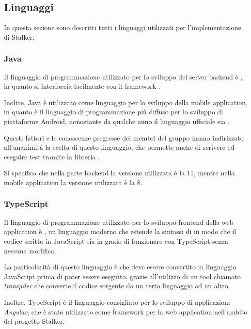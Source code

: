 \documentclass[../../../manuale-manutentore.tex]{subfiles}
\begin{document}
\subsection{Linguaggi}%
\label{sub:linguaggi}
In questa sezione sono descritti tutti i linguaggi utilizzati per l'implementazione di Stalker.

\subsubsection{Java}%
\label{subs:java}

Il linguaggio di programmazione utilizzato per lo sviluppo del server backend è , in quanto si interfaccia facilmente con il framework .

Inoltre, Java è utilizzato come linguaggio per lo sviluppo della mobile application, in quanto è il linguaggio di programmazione più diffuso per lo sviluppo di piattaforme Android, nonostante da qualche anno il linguaggio ufficiale sia .

Questi fattori e le conoscenze pregresse dei membri del gruppo hanno indirizzato all'unanimità la scelta di questo linguaggio, che permette anche di scrivere ed eseguire test tramite la libreria .

Si specifica che nella parte backend la versione utilizzata è la 11, mentre nella mobile application la versione utilizzata è la 8.

\subsubsection{TypeScript}%
\label{subs:typescript}

Il linguaggio di programmazione utilizzato per lo sviluppo frontend della web application è , un linguaggio moderno che estende la sintassi di  in modo che il codice scritto in JavaScript sia in grado di funzionare con TypeScript senza nessuna modifica.

La particolarità di questo linguaggio è che deve essere convertito in linguaggio JavaScript prima di poter essere eseguito, grazie all'utilizzo di un tool chiamato \textit{transpiler} che converte il codice sorgente da un certo linguaggio ad un altro.

Inoltre, TypeScript è il linguaggio consigliato per lo sviluppo di applicazioni \textit{Angular}, che è stato utilizzato come framework per la web application nell'ambito del progetto Stalker.
\end{document}
